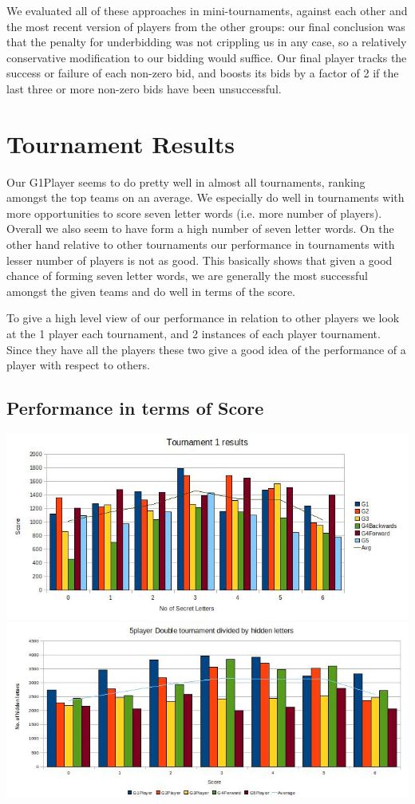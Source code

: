 \documentclass[11pt]{article}
\begin{document}
We evaluated all of these approaches in mini-tournaments, against each other and the most recent version of players from the other groups: our final conclusion was that the penalty for underbidding was not crippling us in any case, so a relatively conservative modification to our bidding would suffice.  Our final player tracks the success or failure of each non-zero bid, and boosts its bids by a factor of 2 if the last three or more non-zero bids have been unsuccessful. %



\section{Tournament Results} %
	Our G1Player seems to do pretty well in almost all tournaments, ranking amongst the top teams on an average. We especially do well in tournaments with more opportunities to score seven letter words (i.e. more number of players). Overall we also seem to have form a high number of seven letter words. On the other hand relative to other tournaments our performance in tournaments with lesser number of players is not as good. This basically shows that given a good chance of forming seven letter words, we are generally the most successful amongst the given teams and do well in terms of the score.
	
	To give a high level view of our performance in relation to other players we look at the 1 player each tournament, and 2 instances of each player tournament. Since they have all the players these two give a good idea of the performance of a player with respect to others. 
	
	\subsection{Performance in terms of Score}
	
	\includegraphics[width=1\textwidth]{T1Results}
	\includegraphics[width=1\textwidth]{T2Results}
	
\end{document}
